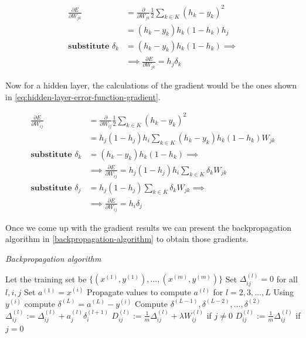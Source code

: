 \begin{equation}
  \begin{aligned}
    \label{eq:output-layer-error-function-gradient}
    \frac{\partial E}{\partial W_{jk}} & = \frac{\partial}{\partial
      W_{jk}} \frac{1}{2} \sum_{k \in K} (h_k - y_k)^2 \\
    & = (h_k - y_k)h_k(1-h_k)h_j \\
    \textbf{substitute } \delta_k & = (h_k - y_k)h_k(1-h_k) \implies \\
    & \implies \frac{\partial E}{\partial W_{jk}} = h_j \delta_k
  \end{aligned}
\end{equation}

Now for a hidden layer, the calculations of the gradient would be the
ones shown in \autoref{eq:hidden-layer-error-function-gradient}.

\begin{equation}
  \begin{aligned}
    \label{eq:hidden-layer-error-function-gradient}
    \frac{\partial E}{\partial W_{ij}} & = \frac{\partial}{\partial
      W_{ij}} \frac{1}{2} \sum_{k \in K} (h_k - y_k)^2 \\
    & = h_j(1-h_j)h_i \sum_{k \in K} (h_k - y_k) h_k(1 - h_k) W_{jk}  \\
    \textbf{substitute } \delta_k & = (h_k - y_k) h_k(1 - h_k) \implies \\
    & \implies \frac{\partial E}{\partial W_{ij}} = h_j(1-h_j)h_i
    \sum_{k \in K} \delta_k W_{jk} \\
    \textbf{substitute } \delta_j & = h_j(1-h_j) \sum_{k \in K} \delta_k
    W_{jk}  \implies \\ 
    & \implies \frac{\partial E}{\partial W_{ij}} = h_i\delta_j
  \end{aligned}
\end{equation}

Once we come up with the gradient results we can present the
backpropagation algorithm in \autoref{backpropagation-algorithm} to
obtain those gradients.

\begin{algorithm}[H]
  \caption{\textit{Backpropagation algorithm}}
  \label{backpropagation-algorithm}
  \begin{algorithmic}[1]
    \State Let the training set be $\{(x^{(1)},y^{(1)}),\dots,
    (x^{(m)},y^{(m)})\}$
    \State Set $\Delta_{ij}^{(l)} = 0$ for all $l,i,j$
    \State Set $a^{(1)} = x^{(i)}$
    \State Propagate values to compute $a^{(l)}$ for $l = 2,
    3, \dots, L$
    \State Using $y^{(i)}$ compute $\delta^{(L)} = a^{(L)} - y^{(i)}$
    \State Compute $\delta^{(L-1)}, \delta^{(L-2)}, \dots,
    \delta^{(2)}$
    \State $\Delta_{ij}^{(l)} := \Delta_{ij}^{(l)} + a_j^{(l)} \delta_i^{(l+1)}$
    \EndFor
    \State $D_{ij}^{(l)} := \frac{1}{m} \Delta_{ij}^{(l)} + \lambda
    W_{ij}^{(l)}$ if $j \neq 0$
    \State $D_{ij}^{(l)} := \frac{1}{m} \Delta_{ij}^{(l)}$ if $j = 0$
  \end{algorithmic}
\end{algorithm}


